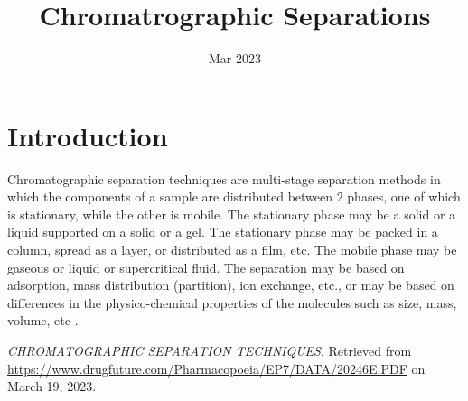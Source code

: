 \documentclass{article}
\title{Chromatrographic Separations}
\date{Mar 2023}
\begin{document}
\maketitle

\section{Introduction}

Chromatographic separation techniques are multi-stage separation methods in
which the components of a sample are distributed between 2 phases, one of which
is stationary, while the other is mobile. The stationary phase may be a solid
or a liquid supported on a solid or a gel. The stationary phase may be packed
in a column, spread as a layer, or distributed as a film, etc. The mobile phase
may be gaseous or liquid or supercritical fluid. The separation may be based on
adsorption, mass distribution (partition), ion exchange, etc., or may be based
on differences in the physico-chemical properties of the molecules such as
size, mass, volume, etc \cite{convo}.

\begin{thebibliography}
  \textit{CHROMATOGRAPHIC SEPARATION TECHNIQUES}.
  Retrieved from \url{https://www.drugfuture.com/Pharmacopoeia/EP7/DATA/20246E.PDF} on March 19, 2023.
\end{thebibliography}
\end{document}
